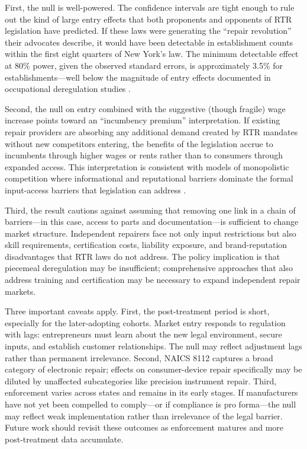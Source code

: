 \documentclass[12pt]{article}
\begin{document}
First, the null is well-powered. The confidence intervals are tight enough to rule out the kind of large entry effects that both proponents and opponents of RTR legislation have predicted. If these laws were generating the ``repair revolution'' their advocates describe, it would have been detectable in establishment counts within the first eight quarters of New York's law. The minimum detectable effect at 80\% power, given the observed standard errors, is approximately 3.5\% for establishments---well below the magnitude of entry effects documented in occupational deregulation studies \citep{thornton2015effects}.

Second, the null on entry combined with the suggestive (though fragile) wage increase points toward an ``incumbency premium'' interpretation. If existing repair providers are absorbing any additional demand created by RTR mandates without new competitors entering, the benefits of the legislation accrue to incumbents through higher wages or rents rather than to consumers through expanded access. This interpretation is consistent with models of monopolistic competition where informational and reputational barriers dominate the formal input-access barriers that legislation can address \citep{tirole1988theory}.

Third, the result cautions against assuming that removing one link in a chain of barriers---in this case, access to parts and documentation---is sufficient to change market structure. Independent repairers face not only input restrictions but also skill requirements, certification costs, liability exposure, and brand-reputation disadvantages that RTR laws do not address. The policy implication is that piecemeal deregulation may be insufficient; comprehensive approaches that also address training and certification may be necessary to expand independent repair markets.

Three important caveats apply. First, the post-treatment period is short, especially for the later-adopting cohorts. Market entry responds to regulation with lags: entrepreneurs must learn about the new legal environment, secure inputs, and establish customer relationships. The null may reflect adjustment lags rather than permanent irrelevance. Second, NAICS 8112 captures a broad category of electronic repair; effects on consumer-device repair specifically may be diluted by unaffected subcategories like precision instrument repair. Third, enforcement varies across states and remains in its early stages. If manufacturers have not yet been compelled to comply---or if compliance is pro forma---the null may reflect weak implementation rather than irrelevance of the legal barrier. Future work should revisit these outcomes as enforcement matures and more post-treatment data accumulate.
\end{document}
